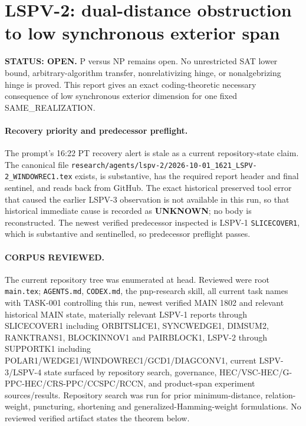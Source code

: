 \documentclass[11pt]{article}
\begin{document}
\section*{LSPV-2: dual-distance obstruction to low synchronous exterior span}
\textbf{STATUS: OPEN.} P versus NP remains open. No unrestricted SAT lower bound, arbitrary-algorithm transfer, nonrelativizing hinge, or nonalgebrizing hinge is proved. This report gives an exact coding-theoretic necessary consequence of low synchronous exterior dimension for one fixed SAME\_REALIZATION.

\paragraph{Recovery priority and predecessor preflight.}
The prompt's 16:22 PT recovery alert is stale as a current repository-state claim. The canonical file \texttt{research/agents/lspv-2/2026-10-01\_1621\_LSPV-2\_WINDOWREC1.tex} exists, is substantive, has the required report header and final sentinel, and reads back from GitHub. The exact historical preserved tool error that caused the earlier LSPV-3 observation is not available in this run, so that historical immediate cause is recorded as \textbf{UNKNOWN}; no body is reconstructed. The newest verified predecessor inspected is LSPV-1 \texttt{SLICECOVER1}, which is substantive and sentinelled, so predecessor preflight passes.

\paragraph{CORPUS REVIEWED.}
The current repository tree was enumerated at head. Reviewed were root \texttt{main.tex}; \texttt{AGENTS.md}, \texttt{CODEX.md}, the pnp-research skill, all current task names with TASK-001 controlling this run, newest verified MAIN 1802 and relevant historical MAIN state, materially relevant LSPV-1 reports through SLICECOVER1 including ORBITSLICE1, SYNCWEDGE1, DIMSUM2, RANKTRANS1, BLOCKINNOV1 and PAIRBLOCK1, LSPV-2 through SUPPORTK1 including POLAR1/WEDGE1/WINDOWREC1/GCD1/DIAGCONV1, current LSPV-3/LSPV-4 state surfaced by repository search, governance, HEC/VSC-HEC/G-PPC-HEC/CRS-PPC/CCSPC/RCCN, and product-span experiment sources/results. Repository search was run for prior minimum-distance, relation-weight, puncturing, shortening and generalized-Hamming-weight formulations. No reviewed verified artifact states the theorem below.
\end{document}
